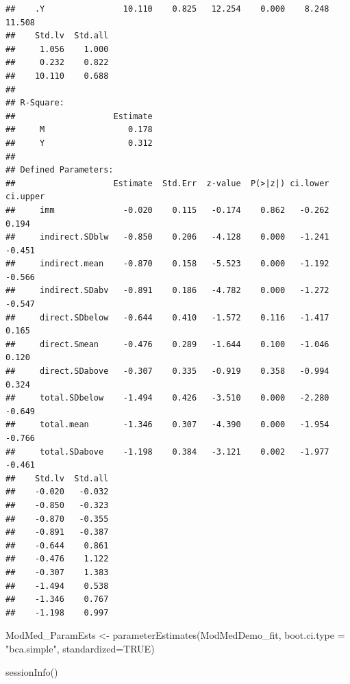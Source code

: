 \documentclass[
  english,
]{book}
\newenvironment{Shaded}{\begin{snugshade}}{\end{snugshade}}
\newcommand{\AttributeTok}[1]{\textcolor[rgb]{0.77,0.63,0.00}{#1}}
\newcommand{\ConstantTok}[1]{\textcolor[rgb]{0.00,0.00,0.00}{#1}}
\newcommand{\FunctionTok}[1]{\textcolor[rgb]{0.00,0.00,0.00}{#1}}
\newcommand{\NormalTok}[1]{#1}
\newcommand{\OtherTok}[1]{\textcolor[rgb]{0.56,0.35,0.01}{#1}}
\newcommand{\StringTok}[1]{\textcolor[rgb]{0.31,0.60,0.02}{#1}}
\begin{document}
\begin{verbatim}
##    .Y                10.110    0.825   12.254    0.000    8.248   11.508
##    Std.lv  Std.all
##     1.056    1.000
##     0.232    0.822
##    10.110    0.688
## 
## R-Square:
##                    Estimate
##     M                 0.178
##     Y                 0.312
## 
## Defined Parameters:
##                    Estimate  Std.Err  z-value  P(>|z|) ci.lower ci.upper
##     imm              -0.020    0.115   -0.174    0.862   -0.262    0.194
##     indirect.SDblw   -0.850    0.206   -4.128    0.000   -1.241   -0.451
##     indirect.mean    -0.870    0.158   -5.523    0.000   -1.192   -0.566
##     indirect.SDabv   -0.891    0.186   -4.782    0.000   -1.272   -0.547
##     direct.SDbelow   -0.644    0.410   -1.572    0.116   -1.417    0.165
##     direct.Smean     -0.476    0.289   -1.644    0.100   -1.046    0.120
##     direct.SDabove   -0.307    0.335   -0.919    0.358   -0.994    0.324
##     total.SDbelow    -1.494    0.426   -3.510    0.000   -2.280   -0.649
##     total.mean       -1.346    0.307   -4.390    0.000   -1.954   -0.766
##     total.SDabove    -1.198    0.384   -3.121    0.002   -1.977   -0.461
##    Std.lv  Std.all
##    -0.020   -0.032
##    -0.850   -0.323
##    -0.870   -0.355
##    -0.891   -0.387
##    -0.644    0.861
##    -0.476    1.122
##    -0.307    1.383
##    -1.494    0.538
##    -1.346    0.767
##    -1.198    0.997
\end{verbatim}

\begin{Shaded}
\begin{Highlighting}[]
\NormalTok{ModMed\_ParamEsts }\OtherTok{\textless{}{-}} \FunctionTok{parameterEstimates}\NormalTok{(ModMedDemo\_fit, }\AttributeTok{boot.ci.type =} \StringTok{"bca.simple"}\NormalTok{, }\AttributeTok{standardized=}\ConstantTok{TRUE}\NormalTok{)}
\end{Highlighting}
\end{Shaded}

\begin{Shaded}
\begin{Highlighting}[]
\FunctionTok{sessionInfo}\NormalTok{()}
\end{Highlighting}
\end{Shaded}
\end{document}
